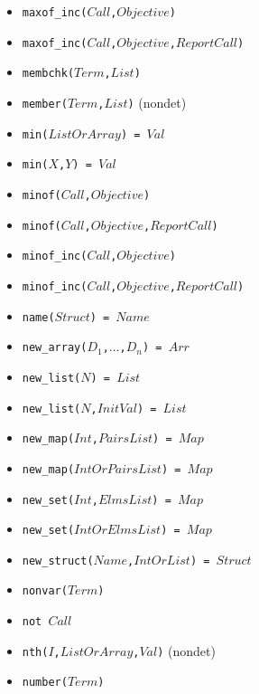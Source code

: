 \documentclass[10pt]{article}
\begin{document}
\begin{multicols}{2}
\begin{scriptsize}
\begin{itemize}
    \item \texttt{maxof\_inc($Call$,$Objective$)} 
    \item \texttt{maxof\_inc($Call$,$Objective$,$ReportCall$)} 
    \item \texttt{membchk($Term$,$List$)} 
    \item \texttt{member($Term$,$List$)} (nondet)
    \item \texttt{min($ListOrArray$) = $Val$} 
    \item \texttt{min($X$,$Y$) = $Val$} 
    \item \texttt{minof($Call$,$Objective$)} 
    \item \texttt{minof($Call$,$Objective$,$ReportCall$)} 
    \item \texttt{minof\_inc($Call$,$Objective$)} 
    \item \texttt{minof\_inc($Call$,$Objective$,$ReportCall$)} 
    \item \texttt{name($Struct$) = $Name$} 
    \item \texttt{new\_array($D_1$,$\ldots$,$D_n$) = $Arr$} 
    \item \texttt{new\_list($N$) = $List$} 
    \item \texttt{new\_list($N$,$InitVal$) = $List$} 
    \item \texttt{new\_map($Int$,$PairsList$) = $Map$} 
    \item \texttt{new\_map($IntOrPairsList$) = $Map$} 
    \item \texttt{new\_set($Int$,$ElmsList$) = $Map$} 
    \item \texttt{new\_set($IntOrElmsList$) = $Map$} 
    \item \texttt{new\_struct($Name$,$IntOrList$) = $Struct$} 
    \item \texttt{nonvar($Term$)} 
    \item \texttt{not $Call$}
    \item \texttt{nth($I$,$ListOrArray$,$Val$)} (nondet)
    \item \texttt{number($Term$)} 

\end{itemize}
\end{scriptsize}
\end{multicols}
\end{document}
